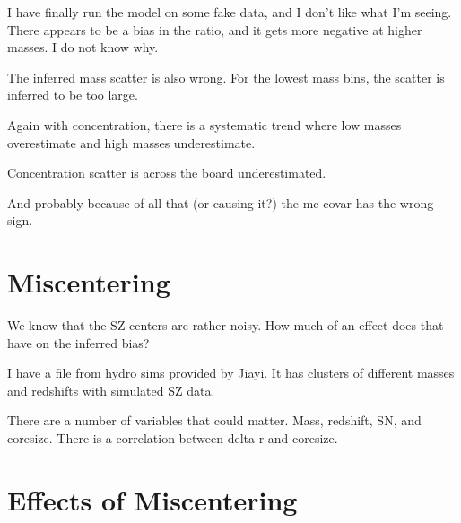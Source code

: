 \documentclass[11pt]{article}
\begin{document}

I have finally run the model on some fake data, and I don't like what I'm seeing. There appears to be a bias in the ratio, and it gets more negative at higher masses. I do not know why.

The inferred mass scatter is also wrong. For the lowest mass bins, the scatter is inferred to be too large.

Again with concentration, there is a systematic trend where low masses overestimate and high masses underestimate.

Concentration scatter is across the board underestimated. 

And probably because of all that (or causing it?) the mc covar has the wrong sign.


\clearpage \newpage


\section{Miscentering}

We know that the SZ centers are rather noisy. How much of an effect does that have on the inferred bias?

I have a file from hydro sims provided by Jiayi. It has clusters of different masses and redshifts with simulated SZ data. 

There are a number of variables that could matter. Mass, redshift, SN, and coresize. There is a correlation between delta r and coresize.


\clearpage \newpage


\section{Effects of Miscentering}
\end{document}
